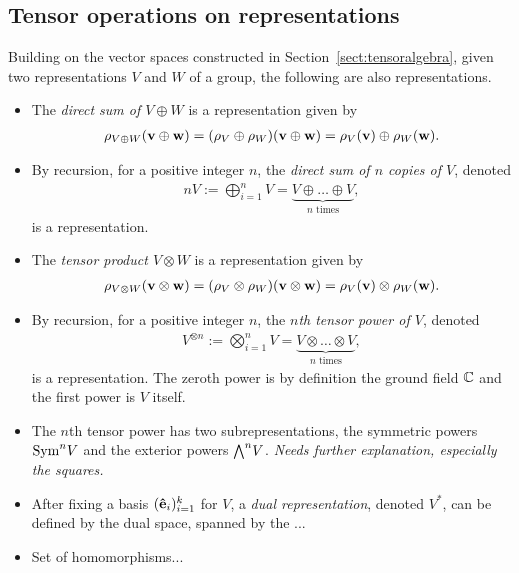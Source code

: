 \subsection{Tensor operations on representations}\label{sect:tensorrepr}

Building on the vector spaces constructed in Section~\ref{sect:tensoralgebra}, given two representations $V$ and $W$ of a group, the following are also representations.

{\allowdisplaybreaks\begin{itemize}
	\item The \emph{direct sum of $V \oplus W$} is a representation given by 
	\begin{align*}
		\rho_{V \oplus W}(\mathbf{v} \oplus \mathbf{w}) = (\rho_V \oplus \rho_W)(\mathbf{v} \oplus \mathbf{w}) = \rho_V(\mathbf{v}) \oplus \rho_W(\mathbf{w}).
	\end{align*}
	
	\item By recursion, for a positive integer $n$, the \emph{direct sum of $n$ copies of $V$}, denoted
	\begin{align*}
		nV := \bigoplus_{i=1}^n V = \underset{\text{$n$ times}}{\underbrace{V \oplus \dots \oplus V}},
	\end{align*}
	is a representation.
	
	\item The \emph{tensor product $V \otimes W$} is a representation given by
	\begin{align*}
		\rho_{V \otimes W}(\mathbf{v} \otimes \mathbf{w}) = (\rho_V \otimes \rho_W)(\mathbf{v} \otimes \mathbf{w}) = \rho_V(\mathbf{v}) \otimes \rho_W(\mathbf{w}).
	\end{align*}
	
	\item By recursion, for a positive integer $n$, the \emph{$n$th tensor power of $V$}, denoted
	\begin{align*}
		V^{\otimes n} := \bigotimes_{i=1}^n V = \underset{\text{$n$ times}}{\underbrace{V \otimes \dots \otimes V}},
	\end{align*}
	is a representation. The zeroth power is by definition the ground field $\mathbb{C}$ and the first power is $V$ itself.
	\item The $n$th tensor power has two subrepresentations, the symmetric powers $\text{Sym}^n V$ and the exterior powers ${\bigwedge}^n V$. \textit{Needs further explanation, especially the squares.}
	\item After fixing a basis $(\mathbf{\hat{e}}_i)_{i=1}^k$ for $V$, a \emph{dual representation}, denoted $V^*$, can be defined by the dual space, spanned by the ...
	
	\item Set of homomorphisms...
\end{itemize}}

